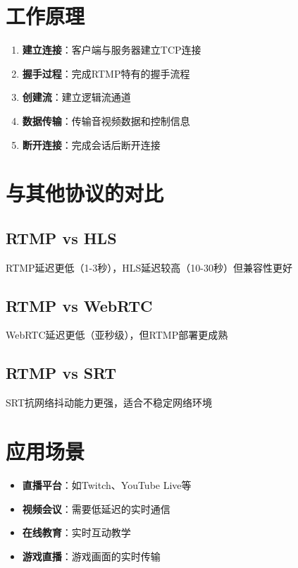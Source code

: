 \documentclass[12pt,UTF8]{ctexbook}
\begin{document}
\chapter{工作原理}

\begin{enumerate}
  \item \textbf{建立连接}：客户端与服务器建立TCP连接
  \item \textbf{握手过程}：完成RTMP特有的握手流程
  \item \textbf{创建流}：建立逻辑流通道
  \item \textbf{数据传输}：传输音视频数据和控制信息
  \item \textbf{断开连接}：完成会话后断开连接
\end{enumerate}

\chapter{与其他协议的对比}

\section{RTMP vs HLS}

RTMP延迟更低（1-3秒），HLS延迟较高（10-30秒）但兼容性更好

\section{RTMP vs WebRTC}

WebRTC延迟更低（亚秒级），但RTMP部署更成熟

\section{RTMP vs SRT}

SRT抗网络抖动能力更强，适合不稳定网络环境

\chapter{应用场景}

\begin{itemize}
  \item \textbf{直播平台}：如Twitch、YouTube Live等
  \item \textbf{视频会议}：需要低延迟的实时通信
  \item \textbf{在线教育}：实时互动教学
  \item \textbf{游戏直播}：游戏画面的实时传输
\end{itemize}
\end{document}
